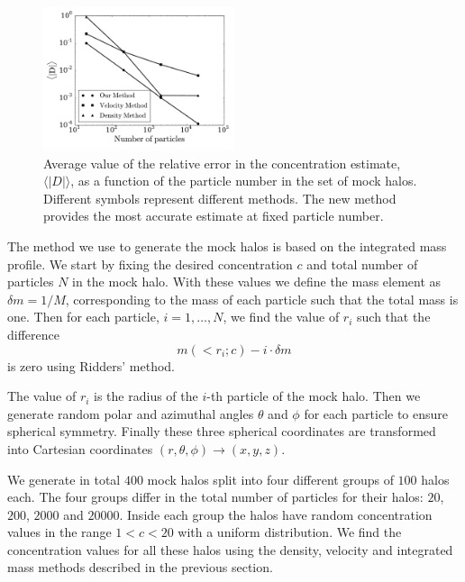 \documentclass{emulateapj}
\newcommand{\avg}[1]{\langle{#1}\rangle}
\begin{document}
\begin{figure}
\begin{center}
  \includegraphics[width=0.50\textwidth]{error.pdf}
\end{center}
\vspace{-0.5cm}
\caption{Average value of the relative error in the concentration
  estimate, $\avg{|D|}$, as a function of the particle number in
  the set of mock halos. Different symbols represent different
  methods. The new method provides the most accurate estimate at fixed
  particle number.
    \label{fig:error}}
\end{figure}





The method we use to generate the mock halos is based on the
integrated mass profile.  We start by fixing the desired concentration
$c$ and total number of particles $N$ in the mock halo.  With these
values we define the mass element as $\delta m = 1/M$, corresponding
to the mass of each particle such that the total mass is one.  Then
for each particle, $i=1,\ldots,N$, we find the value of $r_i$ such
that the difference
% 
\begin{equation}
m(<r_i;c) - i \cdot \delta m
\end{equation}
%
is zero using Ridders' method.

The value of $r_i$ is the radius of the $i$-th particle of the mock
halo.  Then we generate random polar and azimuthal angles $\theta$ and
$\phi$ for each particle to ensure spherical symmetry.  Finally these
three spherical coordinates are transformed into Cartesian coordinates
$(r,\theta,\phi) \rightarrow (x,y,z)$.

We generate in total $400$ mock halos split into four different groups
of $100$ halos each.  The four groups differ in the total number of
particles for their halos: $20$, $200$, $2000$ and $20000$.  Inside
each group the halos have random concentration values in the range
$1<c<20$ with a uniform distribution.  We find the concentration
values for all these halos using the density, velocity and integrated
mass methods described in the previous section.
\end{document}
